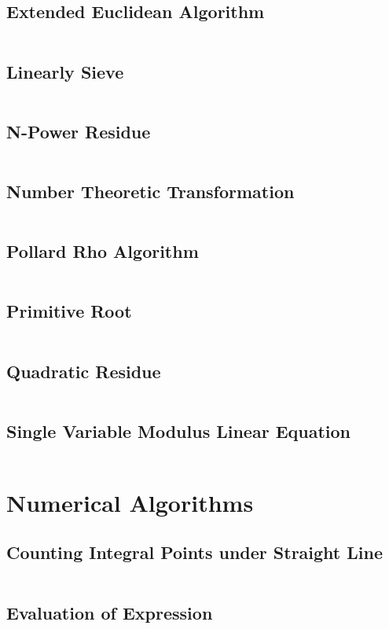 \documentclass[a4paper,openany]{book}
\newcommand{\cppcode}[1]
{
  \inputminted[mathescape,
  tabsize=4,
  linenos,
  framesep=2mm,
  breakaftergroup=true,
  breakautoindent=true,
  breakbytoken=true,
  breaklines=true,
  fontsize=\small
  ]{cpp}{source/#1}
}
\begin{document}
\section{Extended Euclidean Algorithm}
\cppcode{/Number Theory/Extended Euclidean Algorithm.cpp}
\section{Linearly Sieve}
\cppcode{/Number Theory/Linearly Sieve.cpp}
\section{N-Power Residue}
\cppcode{/Number Theory/N-Power Residue.cpp}
\section{Number Theoretic Transformation}
\cppcode{/Number Theory/Number Theoretic Transformation.cpp}
\section{Pollard Rho Algorithm}
\cppcode{/Number Theory/Pollard Rho Algorithm.cpp}
\section{Primitive Root}
\cppcode{/Number Theory/Primitive Root.cpp}
\section{Quadratic Residue}
\cppcode{/Number Theory/Quadratic Residue.cpp}
\section{Single Variable Modulus Linear Equation}
\cppcode{/Number Theory/Single Variable Modulus Linear Equation.cpp}

\chapter{Numerical Algorithms}
\section{Counting Integral Points under Straight Line}
\cppcode{/Numerical Algorithms/Counting Integral Points under Straight Line.cpp}
\section{Evaluation of Expression}
\cppcode{/Numerical Algorithms/Evaluation of Expression.cpp}
\end{document}
